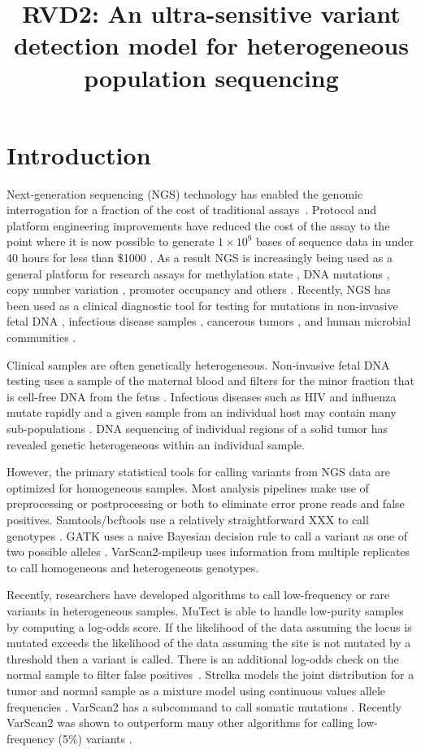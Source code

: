 \documentclass[11pt,reqno]{amsart}
\title[RVD2]{RVD2: An ultra-sensitive variant detection model for heterogeneous population sequencing}
\author{}
\begin{document}
\maketitle

\section{Introduction}


Next-generation sequencing (NGS) technology has enabled the genomic interrogation for a fraction of the cost of traditional assays~\cite{Koboldt2013Cell}. Protocol and platform engineering improvements have reduced the cost of the assay to the point where it is now possible to generate $1\times10^9$ bases of sequence data in under 40 hours for less than \$1000 \cite{}. As a result NGS is increasingly being used as a general platform for research assays for methylation state \cite{}, DNA mutations \cite{}, copy number variation \cite{}, promoter occupancy \cite{} and others \cite{}. Recently, NGS has been used as a clinical diagnostic tool for testing for mutations in non-invasive fetal DNA \cite{}, infectious disease samples \cite{}, cancerous tumors \cite{}, and human microbial communities \cite{}. 

Clinical samples are often genetically heterogeneous. Non-invasive fetal DNA testing uses a sample of the maternal blood and filters for the minor fraction that is cell-free DNA from the fetus \cite{}. Infectious diseases such as HIV and influenza mutate rapidly and a given sample from an individual host may contain many sub-populations \cite{}. DNA sequencing of individual regions of a solid tumor has revealed genetic heterogeneous within an individual sample.  

However, the primary statistical tools for calling variants from NGS data are optimized for homogeneous samples. Most analysis pipelines make use of preprocessing or postprocessing or both to eliminate error prone reads and false positives. Samtools/bcftools use a relatively straightforward XXX to call genotypes \cite{}. GATK uses a naive Bayesian decision rule to call a variant as one of two possible alleles \cite{McKenna2010}. VarScan2-mpileup uses information from multiple replicates to call homogeneous and heterogeneous genotypes.

Recently, researchers have developed algorithms to call low-frequency or rare variants in heterogeneous samples. MuTect is able to handle low-purity samples by computing a log-odds score. If the likelihood of the data assuming the locus is mutated exceeds the likelihood of the data assuming the site is not mutated by a threshold then a variant is called. There is an additional log-odds check on the normal sample to filter false positives~\cite{Cibulskis2013}. Strelka models the joint distribution for a tumor and normal sample as a mixture model using continuous values allele frequencies \cite{}. VarScan2 has a subcommand to call somatic mutations \cite{}. Recently VarScan2 was shown to outperform many other algorithms for calling low-frequency (5\%) variants \cite{}. 
\end{document}
